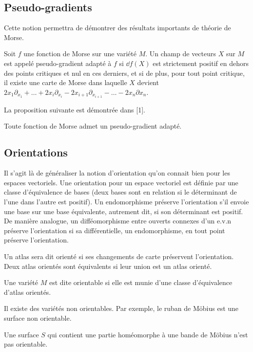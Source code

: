 \subsection{Pseudo-gradients}

Cette notion permettra de démontrer des résultats importants de théorie de Morse.
\begin{defi}
    Soit $f$ une fonction de Morse sur une variété $M$. 
    Un champ de vecteurs $X$ sur $M$ est appelé pseudo-gradient adapté à $f$ si 
    $\dd f(X)$ est strictement positif en dehors des points critiques et nul en 
    ces derniers, et si de plus, pour tout point critique, il existe une carte 
    de Morse dans laquelle $X$ devient 
    $2x_1\partial_{x_1}+\dots+2x_i\partial_{x_i}-2x_{i+1}\partial_{x_{i+1}}-\dots-2x_n\partial{x_n}$.
\end{defi}

La proposition suivante est démontrée dans [1].
\begin{prop}
    Toute fonction de Morse admet un pseudo-gradient adapté.
\end{prop}

\subsection{Orientations}
Il s'agit là de généraliser la notion d'orientation qu'on connait bien pour les 
espaces vectoriels.  
Une orientation pour un espace vectoriel est définie par une classe d'équivalence 
de bases (deux bases sont en relation si le déterminant de l'une dans l'autre est positif). 
Un endomorphisme préserve l'orientation s'il envoie une base sur une base équivalente, 
autrement dit, si son déterminant est positif. 
De manière analogue, un difféomorphisme entre ouverts connexes d'un e.v.n préserve 
l'orientation si sa différentielle, un endomorphisme, en tout point préserve l'orientation.

Un atlas sera dit orienté si ses changements de carte préservent l'orientation. 
Deux atlas orientés sont équivalents si leur union est un atlas orienté.
\begin{defi}
    Une variété $M$ est dite orientable si elle est munie d'une classe d'équivalence 
    d'atlas orientés.
\end{defi}

Il existe des variétés non orientables. Par exemple, le ruban de Möbius est une surface 
non orientable.

\begin{prop}
    Une surface $S$ qui contient une partie homéomorphe à une bande de Möbius n'est pas 
    orientable.
\end{prop}

